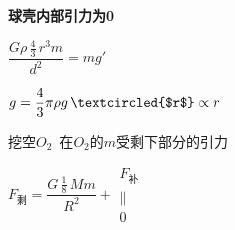 \textbf{球壳内部引力为0}


$\dfrac{G\rho\,\frac{4}{3}\,r^{3}m}{d^{2}}=mg'$%

$g=\dfrac{4}{3}\pi\rho g\,\textcircled{$r$}\propto r$%


挖空$O_2$\ 在$O_2$的$m$受剩下部分的引力

$F_{\text{剩}}=\dfrac{G\,\frac{1}{8}\,Mm}{R^{2}}+\begin{matrix}F_{\text{补}}\\ \|\\ 0\end{matrix}$%
